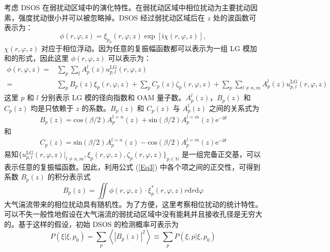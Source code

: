 \documentclass[master]{thesis-uestc}
\begin{document}
考虑  DSOS  在弱扰动区域中的演化特性。在弱扰动区域中相位扰动为主要扰动因素，强度扰动很小并可以被忽略掉。DSOS 经过弱扰动区域后在 $z$ 处的波函数可表示为：
\begin{equation}
\phi(r,\varphi,z)=\xi_{p_0}(r,\varphi,z)\exp{\left[\mathrm{i}\chi(r,\varphi,z)\right]}
\label{Eq2},
\end{equation}
\noindent $\chi(r,\varphi,z)$ 对应于相位浮动。因为任意的复振幅函数都可以表示为一组 LG 模加和的形式\citeup{}，因此这里 $\phi(r,\varphi,z)$ 可以表示为：
\begin{equation}
\begin{split}
\phi(r,\varphi,z)=&{\sum_{p}}{\sum_{l}}A_p^{l}(z)u_{p,l}^\mathrm{LG}(r,\varphi,z)\\
                 =& {\sum_{p}}B_p(z)\xi_p(r,\varphi,z)+{\sum_{p}}C_p(z)\zeta_p(r,\varphi,z)+{\sum_{p}}{\sum_{l\neq{n},m}}A_p^{l}(z)u_{p,l}^\mathrm{LG}(r,\varphi,z)
\label{Eq3}
\end{split}
\end{equation}
\noindent  这里 $p$ 和 $l$ 分别表示 LG 模的径向指数和 OAM 量子数。$A_p^{l}(z)$，$B_p(z)$ 和$C_p(z)$ 均是只依赖于 $z$ 的系数。$B_p(z)$ 和 $C_p(z)$ 与 $A_p^{l}(z)$ 之间的关系式为
\begin{equation}
\begin{split}
B_p(z)=\mathrm{cos}(\beta/2)A_p^{l=n}(z)+\mathrm{sin}(\beta/2)A_p^{l=m}(z)\mathrm{e}^{-\mathrm{i}\theta}
\label{Eqsup1}
\end{split}
\end{equation}
和
\begin{equation}
\begin{split}
C_p(z)=\mathrm{sin}(\beta/2)A_p^{l=n}(z)-\mathrm{cos}(\beta/2)A_p^{l=m}(z)\mathrm{e}^{-\mathrm{i}\theta}
\label{Eqsup2}
\end{split}
\end{equation}
\noindent 易知$\{u_{p,l}^\mathrm{LG}(r,\varphi,z)|_{l\neq{n,m}},\xi_p(r,\varphi,z),\zeta_p(r,\varphi,z)\}_{p\in{\mathbb{N}}}$ 是一组完备正交基，可以表示任意的复振幅函数。因此，利用公式 (\ref{Eq3}) 中各个项之间的正交性，可得到系数 $B_p(z)$ 的积分表示式
\begin{equation}
  B_p(z)=\iint\phi(r,\varphi,z)\cdot\xi_p^\ast(r,\varphi,z)r\mathrm{d}r\mathrm{d}\varphi
\label{Eq4}
\end{equation}
\noindent 大气湍流带来的相位扰动具有随机性。为了方便，这里考察相位扰动的统计特性。可以不失一般性地假设在大气湍流的弱扰动区域中没有能耗并且接收孔径是无穷大的。基于这样的假设，初始 DSOS 的检测概率可表示为
\begin{equation}
P(\xi|\xi,p_0)={\sum_p}\left\langle\left|B_p(z)\right|^2\right\rangle\equiv\sum_p P(\xi,p|\xi,p_0)
\label{Eq5}
\end{equation}
\end{document}
